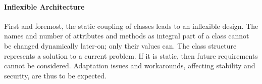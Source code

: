%
%
%
%
%
%
%

\paragraph{Inflexible Architecture}
\label{inflexible_architecture_heading}

First and foremost, the static coupling of classes leads to an inflexible
design. The names and number of attributes and methods as integral part of a
class cannot be changed dynamically later-on; only their values can. The class
structure represents a solution to a current problem. If it is static, then
future requirements cannot be considered. Adaptation issues and workarounds,
affecting stability and security, are thus to be expected.
